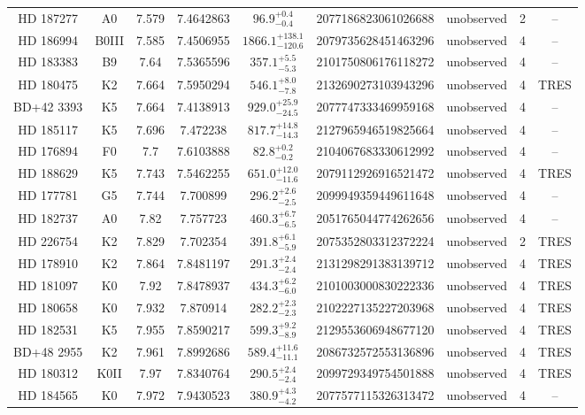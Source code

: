 \begin{table*}
\begin{tabular}{ccccccccc}
HD 187277 & A0 & 7.579 & 7.4642863 & $96.9^{+0.4}_{-0.4}$ & 2077186823061026688 & unobserved & 2 & -- \\
HD 186994 & B0III & 7.585 & 7.4506955 & $1866.1^{+138.1}_{-120.6}$ & 2079735628451463296 & unobserved & 4 & -- \\
HD 183383 & B9 & 7.64 & 7.5365596 & $357.1^{+5.5}_{-5.3}$ & 2101750806176118272 & unobserved & 4 & -- \\
HD 180475 & K2 & 7.664 & 7.5950294 & $546.1^{+8.0}_{-7.8}$ & 2132690273103943296 & unobserved & 4 & TRES \\
BD+42 3393 & K5 & 7.664 & 7.4138913 & $929.0^{+25.9}_{-24.5}$ & 2077747333469959168 & unobserved & 4 & -- \\
HD 185117 & K5 & 7.696 & 7.472238 & $817.7^{+14.8}_{-14.3}$ & 2127965946519825664 & unobserved & 4 & -- \\
HD 176894 & F0 & 7.7 & 7.6103888 & $82.8^{+0.2}_{-0.2}$ & 2104067683330612992 & unobserved & 4 & -- \\
HD 188629 & K5 & 7.743 & 7.5462255 & $651.0^{+12.0}_{-11.6}$ & 2079112926916521472 & unobserved & 4 & TRES \\
HD 177781 & G5 & 7.744 & 7.700899 & $296.2^{+2.6}_{-2.5}$ & 2099949359449611648 & unobserved & 4 & -- \\
HD 182737 & A0 & 7.82 & 7.757723 & $460.3^{+6.7}_{-6.5}$ & 2051765044774262656 & unobserved & 4 & -- \\
HD 226754 & K2 & 7.829 & 7.702354 & $391.8^{+6.1}_{-5.9}$ & 2075352803312372224 & unobserved & 2 & TRES \\
HD 178910 & K2 & 7.864 & 7.8481197 & $291.3^{+2.4}_{-2.4}$ & 2131298291383139712 & unobserved & 4 & TRES \\
HD 181097 & K0 & 7.92 & 7.8478937 & $434.3^{+6.2}_{-6.0}$ & 2101003000830222336 & unobserved & 4 & TRES \\
HD 180658 & K0 & 7.932 & 7.870914 & $282.2^{+2.3}_{-2.3}$ & 2102227135227203968 & unobserved & 4 & TRES \\
HD 182531 & K5 & 7.955 & 7.8590217 & $599.3^{+9.2}_{-8.9}$ & 2129553606948677120 & unobserved & 4 & TRES \\
BD+48 2955 & K2 & 7.961 & 7.8992686 & $589.4^{+11.6}_{-11.1}$ & 2086732572553136896 & unobserved & 4 & TRES \\
HD 180312 & K0II & 7.97 & 7.8340764 & $290.5^{+2.4}_{-2.4}$ & 2099729349754501888 & unobserved & 4 & TRES \\
HD 184565 & K0 & 7.972 & 7.9430523 & $380.9^{+4.3}_{-4.2}$ & 2077577115326313472 & unobserved & 4 & -- \\

\end{tabular}
\end{table*}
